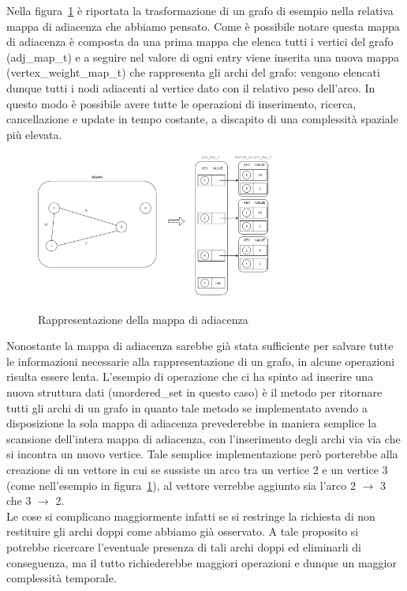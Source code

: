 Nella figura~\ref{fig:AdjMapGraph Abstract} è riportata la trasformazione di un grafo di esempio nella relativa mappa di adiacenza che abbiamo pensato. Come è possibile notare questa mappa di adiacenza è composta da una prima mappa che elenca tutti i vertici del grafo (adj\_map\_t) e a seguire nel valore di ogni entry viene inserita una nuova mappa (vertex\_weight\_map\_t) che rappresenta gli archi del grafo: vengono elencati dunque tutti i nodi adiacenti al vertice dato con il relativo peso dell'arco. In questo modo è possibile avere tutte le operazioni di inserimento, ricerca, cancellazione e update in tempo costante, a discapito di una complessità spaziale più elevata. 

\begin{figure}[h]
	\caption{Rappresentazione della mappa di adiacenza}
	\centering
	\includegraphics[width=0.7\textwidth]{./images/AdjMapGraphAbstract.png}
	\label{fig:AdjMapGraph Abstract}
\end{figure}

Nonostante la mappa di adiacenza sarebbe già stata sufficiente per salvare tutte le informazioni necessarie alla rappresentazione di un grafo, in alcune operazioni risulta essere lenta. L'esempio di operazione che ci ha spinto ad inserire una nuova struttura dati (unordered\_set in questo caso) è il metodo per ritornare tutti gli archi di un grafo in quanto tale metodo se implementato avendo a disposizione la sola mappa di adiacenza prevederebbe in maniera semplice la scansione dell'intera mappa di adiacenza, con l'inserimento degli archi via via che si incontra un nuovo vertice. Tale semplice implementazione però porterebbe alla creazione di un vettore in cui se sussiste un arco tra un vertice 2 e un vertice 3 (come nell'esempio in figura~\ref{fig:AdjMapGraph Abstract}), al vettore verrebbe aggiunto sia l'arco 2 $\rightarrow$ 3 che 3 $\rightarrow$ 2. \\

Le cose si complicano maggiormente infatti se si restringe la richiesta di non restituire gli archi doppi come abbiamo già osservato. A tale proposito si potrebbe ricercare l'eventuale presenza di tali archi doppi ed eliminarli di conseguenza, ma il tutto richiederebbe maggiori operazioni e dunque un maggior complessità temporale.\\

